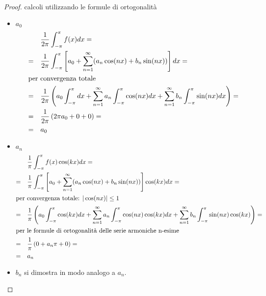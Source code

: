 \documentclass[12pt, a4paper]{article}
\theoremstyle{break}
\begin{document}
\begin{proof} calcoli utilizzando le formule di ortogonalità
	\begin{itemize}
		\item $a_0$
		      \begin{align*}
			              & \frac{1}{2\pi} \int_{-\pi}^{\pi} f(x) dx =           \\
			      = \quad & \frac{1}{2\pi} \int_{-\pi}^{\pi} \left[a_0 +
			      \sum_{n=1}^{\infty} (a_n \cos(nx) + b_n \sin(nx))\right] dx  = \\
			      \intertext{per convergenza totale}
			      = \quad & \frac{1}{2\pi} \left( a_0 \int_{-\pi}^{\pi} dx +
			      \sum_{n=1}^{\infty} a_n \int_{-\pi}^{\pi} \cos(nx) dx +
			      \sum_{n=1}^{\infty} b_n \int_{-\pi}^{\pi} \sin(nx) dx \right)
			      =                                                              \\
			      = \quad & \frac{1}{2\pi} \left( 2\pi a_0 + 0 + 0 \right)   =   \\
			      = \quad & a_0
		      \end{align*}
		\item $a_n$
		      \begin{align*}
			              & \frac{1}{\pi} \int_{-\pi}^{\pi} f(x) \cos(kx) dx =       \\
			      = \quad & \frac{1}{\pi} \int_{-\pi}^{\pi} \left[a_0 +
			      \sum_{n=1}^{\infty} (a_n \cos(nx) + b_n \sin(nx))\right]
			      \cos(kx) dx =                                                      \\
			      \intertext{per convergenza totale: $| \cos(nx) | \leq 1$ }
			      = \quad & \frac{1}{\pi} \left( a_0 \int_{-\pi}^{\pi} \cos(kx) dx +
			      \sum_{n=1}^{\infty} a_n \int_{-\pi}^{\pi} \cos(nx) \cos(kx) dx +
			      \sum_{n=1}^{\infty} b_n \int_{-\pi}^{\pi} \sin(nx) \cos(kx)
			      \right)                                                 =          \\
			      \intertext{per le formule di ortogonalità delle serie armoniche
				      n-esime}
			      = \quad & \frac{1}{\pi} \left( 0 + a_n \pi + 0 \right)  =          \\
			      = \quad & a_n
		      \end{align*}
		\item $b_n$ si dimostra in modo analogo a $a_n$.
	\end{itemize}
\end{proof}
\end{document}
